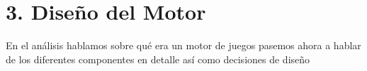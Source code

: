 \chapter*{3. Diseño del Motor}\label{cap:design}

En el análisis hablamos sobre qué era un motor de juegos pasemos ahora a hablar de los diferentes componentes en detalle
así como decisiones de diseño






